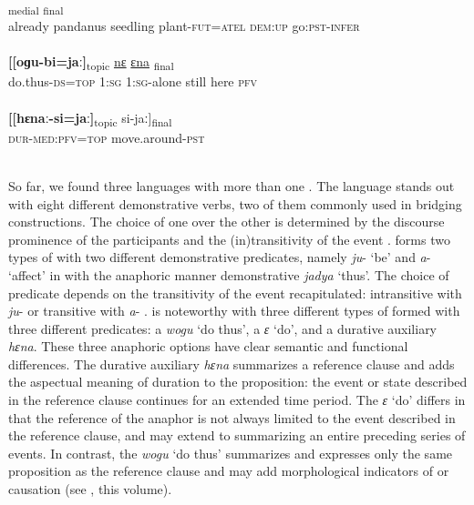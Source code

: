 \documentclass[output=paper]{LSP/langsci}
\begin{document}
\begin{exe}
\ex \label{GuAiAiex:30ac}
\begin{xlist}
\ex \label{GuAiAiex:30a}
\gll	[ɛimɛ	oɡa	ɛ	ɡɛ-mɛna=ta]\textsubscript{medial}	\underline{\smash{[holo}}	\underline{\smash{anɛ-obo]}}\textsubscript{final}\\
already	pandanus	seedling	plant-\textsc{fut=atel}	\textsc{dem:up}	go:\textsc{pst-infer}\\
\glt ‎\\
\ex \label{GuAiAiex:30b}
\gll	\textbf{[[oɡu-bi=jaː]}\textsubscript{topic}	\underline{nɛ}	\underline{}	\underline{ɛna}	\underline{}	\underline{\smash{di]}}\textsubscript{final}\\
do.thus\textsc{-ds=top}	\textsc{1:sg}	\textsc{1:sg-}alone	still	here	\textsc{pfv}\\
\glt {}\\
\ex \label{GuAiAiex:30c}
\gll	\textbf{[[hɛnaː-si=jaː]}\textsubscript{topic}	si-jaː]\textsubscript{final}\\
\textsc{dur-med:pfv=top}	move.around\textsc{-pst}\\
\glt	{}\\
\end{xlist}
\end{exe}

So far, we found three languages with more than one . The language  stands out with  eight different demonstrative verbs, two of them  commonly used in bridging constructions. The choice of one over the other is determined by the discourse prominence of the participants and the (in)transitivity of the event \citep[][257, 499, 589]{overall17}.  forms two types of  with two different demonstrative predicates, namely \textit{ju}- `be' and \textit{a}- `affect' in  with the anaphoric manner demonstrative \textit{jadya} `thus'. The choice of predicate depends on the transitivity of the event recapitulated: intransitive with \textit{ju}- or transitive with \textit{a}- \citep[][128]{Guillaume2011}.  is noteworthy with three different types of  formed with three different predicates: a  \textit{wogu} `do thus', a  \textit{ɛ} `do', and a durative auxiliary \textit{hɛna}. These three anaphoric options have clear semantic and functional differences. The durative auxiliary \textit{hɛna} summarizes a reference clause and adds the aspectual meaning of duration to the proposition: the event or state described in the reference clause continues for an extended time period. The  \textit{ɛ} `do' differs in that the reference of the anaphor is not always limited to the event described in the reference clause, and may extend to summarizing an entire preceding series of events. In contrast, the  \textit{wogu} `do thus' summarizes and expresses only the same proposition as the reference clause and may add morphological indicators of  or causation (see \citeauthor{aiton18}, this volume).
\end{document}
